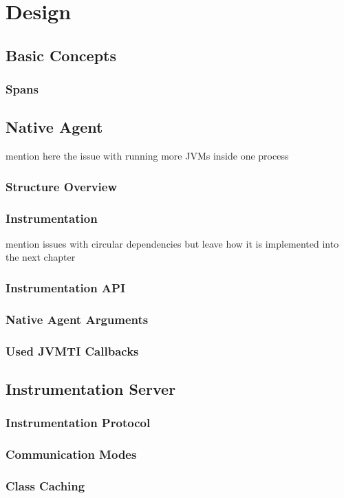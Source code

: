 \chapter{Design}
\section{Basic Concepts}
\subsection{Spans}
\label{subsec:spans}
\section{Native Agent}
mention here the issue with running more JVMs inside one process
\subsection{Structure Overview}
\subsection{Instrumentation}
mention issues with circular dependencies but leave how it is implemented into the next chapter
\subsection{Instrumentation API}
\subsection{Native Agent Arguments}
\subsection{Used JVMTI Callbacks}
\section{Instrumentation Server}
\subsection{Instrumentation Protocol }
\subsection{Communication Modes}
\subsection{Class Caching}
